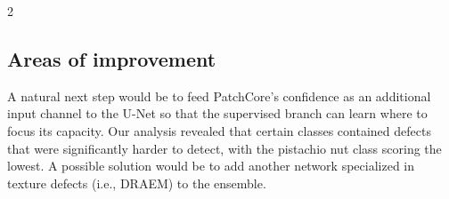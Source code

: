 \documentclass[11pt]{article}
\begin{document}
\begin{multicols}{2}
        \subsection{Areas of improvement}
        A natural next step would be to feed PatchCore's
        confidence as an additional input channel to the U-Net so that the
        supervised branch can learn where to focus its capacity.
        Our analysis revealed that certain classes contained defects that were significantly harder to detect, with the pistachio nut class scoring the lowest. A possible solution would be to add another network specialized in texture defects (i.e., DRAEM) to the ensemble.

        
        

    \end{multicols}
\end{document}
